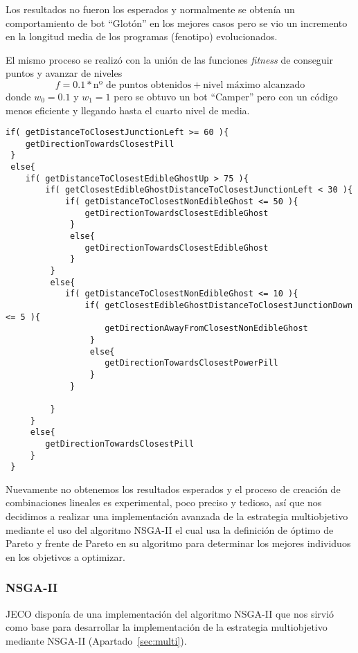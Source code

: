 Los resultados no fueron los esperados y normalmente se obtenía un comportamiento de bot ``Glotón'' en los mejores casos pero se vio un incremento en la longitud media de los programas (fenotipo) evolucionados.

El mismo proceso se realizó con la unión de las funciones \textit{fitness} de conseguir puntos y avanzar de niveles
\begin{equation}
f = 0.1 * \textrm{nº de puntos obtenidos} + \textrm{nivel máximo alcanzado}
\end{equation}
donde $w_0 = 0.1$ y $w_1 = 1$ pero se obtuvo un bot ``Camper'' pero con un código menos eficiente y llegando hasta el cuarto nivel de media.

\begin{lstlisting}[frame=single, breaklines=no, basicstyle=\fontsize{10}{11}\ttfamily, caption=Código del bot Camper obtenido mediante funciones agregativas.]
if( getDistanceToClosestJunctionLeft >= 60 ){ 
    getDirectionTowardsClosestPill
 }
 else{ 
    if( getDistanceToClosestEdibleGhostUp > 75 ){ 
        if( getClosestEdibleGhostDistanceToClosestJunctionLeft < 30 ){ 
            if( getDistanceToClosestNonEdibleGhost <= 50 ){ 
                getDirectionTowardsClosestEdibleGhost
             }
             else{ 
                getDirectionTowardsClosestEdibleGhost
             }
         }
         else{ 
            if( getDistanceToClosestNonEdibleGhost <= 10 ){ 
                if( getClosestEdibleGhostDistanceToClosestJunctionDown <= 5 ){ 
                    getDirectionAwayFromClosestNonEdibleGhost
                 }
                 else{ 
                    getDirectionTowardsClosestPowerPill
                 }
             }
 
         }
     }
     else{ 
        getDirectionTowardsClosestPill
     }
 }
\end{lstlisting}

Nuevamente no obtenemos los resultados esperados y el proceso de creación de combinaciones lineales es experimental, poco preciso y tedioso, así que nos decidimos a realizar una implementación avanzada de la estrategia multiobjetivo mediante el uso del algoritmo NSGA-II el cual usa la definición de óptimo de Pareto y frente de Pareto en su algoritmo para determinar los mejores individuos en los objetivos a optimizar.

\subsubsection{NSGA-II}
JECO disponía de una implementación del algoritmo NSGA-II que nos sirvió como base para desarrollar la implementación de la estrategia multiobjetivo mediante NSGA-II (Apartado~\ref{sec:multi}).
 
